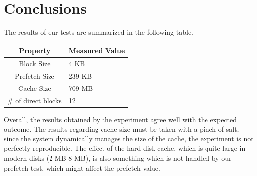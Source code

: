 \documentclass[twocolumn,11pt]{article}
\begin{document}
\begin{sloppypar}
\section{Conclusions}
\label{sec:Conclusions}

The results of our tests are summarized in the following table.

\begin{tabular}{|c|l|}
\hline
	\textbf{Property} & \textbf{Measured Value} \\
\hline
	Block Size & 4 KB \\
\hline
	Prefetch Size & 239 KB \\
\hline
	Cache Size & 709 MB \\
\hline
	\# of direct blocks & 12 \\
\hline
\end{tabular}


Overall, the results obtained by the experiment agree well with the expected
outcome. The results regarding cache size must be taken with a pinch of salt,
since the system dynamically manages the size of the cache, the experiment
is not perfectly reproducible. The effect of the hard disk cache, which is
quite large in modern disks (2 MB-8 MB), is also something which is not handled
by our prefetch test, which might affect the prefetch value.
\end{sloppypar}

\setlength{\baselineskip}{12pt}

\noindent{


}
\end{document}
